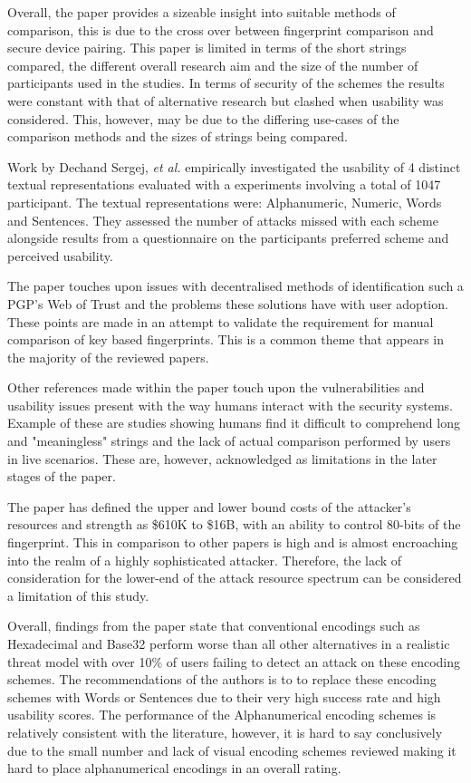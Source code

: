 Overall, the paper provides a sizeable insight into suitable methods of comparison, this is due to the cross over between fingerprint comparison and secure device pairing. This paper is limited in terms of the short strings compared, the different overall research aim and the size of the number of participants used in the studies. In terms of security of the schemes the results were constant with that of alternative research but clashed when usability was considered. This, however, may be due to the differing use-cases of the comparison methods and the sizes of strings being compared.

Work by Dechand Sergej, \textit{et al.}\cite{dechand2016empirical} empirically investigated the usability of 4 distinct textual representations evaluated with a experiments involving a total of 1047 participant. The textual representations were: Alphanumeric, Numeric, Words and Sentences. They assessed the number of attacks missed with each scheme alongside results from a questionnaire on the participants preferred scheme and perceived usability.

The paper touches upon issues with decentralised methods of identification such a PGP's Web of Trust and the problems these solutions have with user adoption. These points are made in an attempt to validate the requirement for manual comparison of key based fingerprints. This is a common theme that appears in the majority of the reviewed papers.

Other references made within the paper touch upon the vulnerabilities and usability issues present with the way humans interact with the security systems. Example of these are studies showing humans find it difficult to comprehend long and "meaningless" strings and the lack of actual comparison performed by users in live scenarios. These are, however, acknowledged as limitations in the later stages of the paper.

The paper has defined the upper and lower bound costs of the attacker's resources and strength as \$610K to \$16B, with an ability to control 80-bits of the fingerprint. This in comparison to other papers is high and is almost encroaching into the realm of a highly sophisticated attacker. Therefore, the lack of consideration for the lower-end of the attack resource spectrum can be considered a limitation of this study.

Overall, findings from the paper state that conventional encodings such as Hexadecimal and Base32 perform worse than all other alternatives in a realistic threat model with over 10\% of users failing to detect an attack on these encoding schemes. The recommendations of the authors is to to replace these encoding schemes with Words or Sentences due to their very high success rate and high usability scores. The performance of the Alphanumerical encoding schemes is relatively consistent with the literature, however, it is hard to say conclusively due to the small number and lack of visual encoding schemes reviewed making it hard to place alphanumerical encodings in an overall rating.


